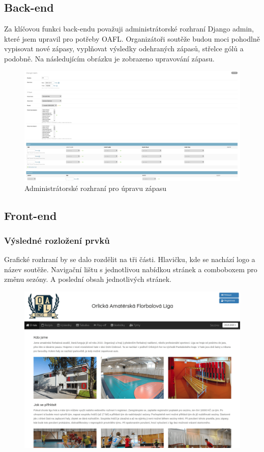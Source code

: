 \documentclass[11pt, a4paper, titlepage]{article}
\begin{document}
\subsection{Back-end}

Za klíčovou funkci back-endu považuji administrátorské rozhraní Django admin, které jsem upravil pro potřeby OAFL. Organizátoři soutěže budou moci pohodlně vypisovat nové zápasy, vyplňovat výsledky odehraných zápasů, střelce gólů a podobně. Na následujícím obrázku je zobrazeno upravování zápasu.

\begin{figure}[H]
    \centering
    \includegraphics[width=.99\textwidth]{images/admin.png}\hfill
    \caption{Administrátorské rozhraní pro úpravu zápasu}
\end{figure}

\subsection{Front-end}

\subsubsection{Výsledné rozložení prvků}

Grafické rozhraní by se dalo rozdělit na tři části. Hlavičku, kde se nachází logo a název soutěže. Navigační lištu s jednotlivou nabídkou stránek a comboboxem pro změnu sezóny. A poslední obsah jednotlivých stránek.

\begin{figure}[H]
    \centering
    \includegraphics[width=.8\textwidth]{images/home.png}\hfill
\end{figure}
\end{document}
